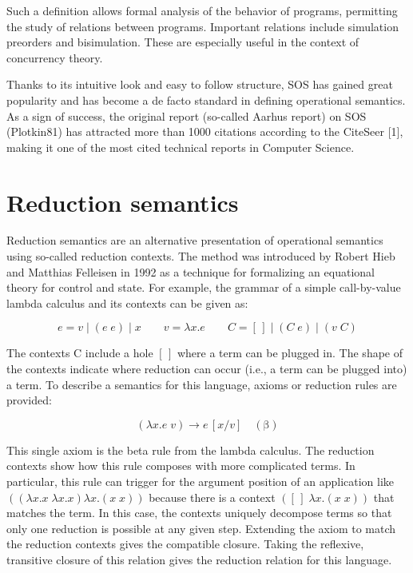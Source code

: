 \documentclass[12pt,b5paper]{book}
\theoremstyle{definition}
\begin{document}
Such a definition allows formal analysis of the behavior of programs, permitting the study of relations between programs. Important relations include simulation preorders and bisimulation. These are especially useful in the context of concurrency theory.

Thanks to its intuitive look and easy to follow structure, SOS has gained great popularity and has become a de facto standard in defining operational semantics. As a sign of success, the original report (so-called Aarhus report) on SOS (Plotkin81) has attracted more than 1000 citations according to the CiteSeer [1], making it one of the most cited technical reports in Computer Science.


\section{Reduction semantics}

Reduction semantics are an alternative presentation of operational semantics using so-called reduction contexts. The method was introduced by Robert Hieb and Matthias Felleisen in 1992 as a technique for formalizing an equational theory for control and state. For example, the grammar of a simple call-by-value lambda calculus and its contexts can be given as:

$$e = v \;|\; (e\; e) \;|\; x \quad\quad v = \lambda x.e \quad\quad C = \left[\,\right] \;|\; (C\; e) \;|\; (v\; C) $$

The contexts C include a hole $\left[\,\right]$ where a term can be plugged in. The shape of the contexts indicate where reduction can occur (i.e., a term can be plugged into) a term. To describe a semantics for this language, axioms or reduction rules are provided:

$$(\lambda x.e\; v) \longrightarrow e\,\left[x / v\right] \quad (\mathrm{\beta})$$

This single axiom is the beta rule from the lambda calculus. The reduction contexts show how this rule composes with more complicated terms. In particular, this rule can trigger for the argument position of an application like $((\lambda x.x \; \lambda x.x) \lambda x.(x\;x))$ because there is a context $([\,]\; \lambda x.(x\;x))$ that matches the term. In this case, the contexts uniquely decompose terms so that only one reduction is possible at any given step. Extending the axiom to match the reduction contexts gives the compatible closure. Taking the reflexive, transitive closure of this relation gives the reduction relation for this language.
\end{document}
